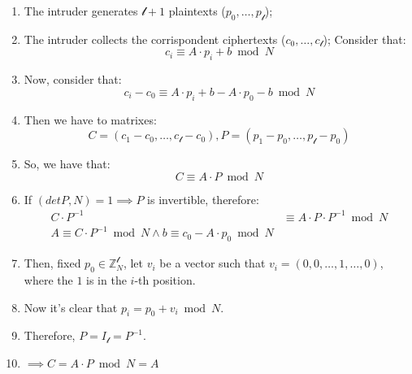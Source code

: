 \begin{enumerate}
    \item The intruder generates $\mathcal{l} + 1$ plaintexts ($p_{0}, \dots, p_{\mathcal{l}}$);
    \item The intruder collects the corrispondent ciphertexts ($c_{0}, \dots, c_{\mathcal{l}}$); Consider that:
    \[c_{i} \equiv A \cdot p_{i} + b \bmod N\]
    \item Now, consider that:
    \[c_{i} - c_{0} \equiv A \cdot p_{i} + b - A \cdot p_{0} - b \bmod N\]
    \item Then we have to matrixes:
    \[C = (c_{1} - c_{0}, \dots, c_{\mathcal{l}} - c_{0}), P = (p_{1} - p_{0}, \dots, p_{\mathcal{l}} - p_{0})\]
    \item So, we have that:
    \[C \equiv A \cdot P \bmod N\]
    \item If $(det P, N) = 1 \implies P$ is invertible, therefore:
    \begin{align*}
        C \cdot P^{-1} &\equiv A \cdot P \cdot P^{-1} \bmod N \\
        A \equiv C \cdot P^{-1} \bmod N  \land b \equiv c_{0} - A \cdot p_{0} \bmod N
    \end{align*}
    \item Then, fixed $p_{0} \in \mathbb{Z}_{N}^{\mathcal{l}}$, let $v_{i}$ be a vector such that $v_{i} = (0, 0, \dots, 1, \dots, 0)$, where the $1$ is in the $i$-th position.
    \item Now it's clear that $p_{i} = p_{0} + v_{i} \bmod N$.
    \item Therefore, $P = I_{\mathcal{l}} = P^{-1}$.
    \item $\implies C = A \cdot P \bmod N = A$
\end{enumerate}
